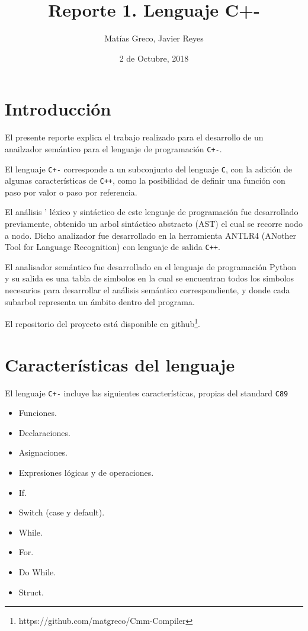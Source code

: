 \documentclass[12pt]{article}
\newcommand{\Cp}{\texttt{C+-}}
\newcommand{\C}{\texttt{C}}
\newcommand{\Cpp}{\texttt{C++}}
\begin{document}

\title{Reporte 1. Lenguaje C+-}
\author{Mat\'ias Greco, Javier Reyes}
\date{2 de Octubre, 2018}
\maketitle

\section*{Introducci\'on}
El presente reporte explica el trabajo realizado para el desarrollo de un anailzador sem\'antico para el lenguaje de programaci\'on \Cp.

El lenguaje \texttt{C+-} corresponde a un subconjunto del lenguaje \C, con la adici\'on de algunas caracter\'isticas de \Cpp, como la posibilidad de definir una funci\'on con paso por valor o paso por referencia.

El an\'alisis  ' l\'exico y sint\'actico de este lenguaje de programación fue desarrollado previamente, obtenido un arbol sintáctico abstracto (AST) el cual se recorre nodo a nodo. Dicho analizador fue desarrollado en la herramienta ANTLR4 (ANother Tool for Language Recognition) con lenguaje de salida \Cpp. 

El analisador sem\'antico fue desarrollado en el lenguaje de programación Python y su salida es una tabla de simbolos en la cual se encuentran todos los simbolos necesarios para desarrollar el an\'alisis sem\'antico correspondiente, y donde cada subarbol representa un \'ambito dentro del programa.

El repositorio del proyecto está disponible en github\footnote{https://github.com/matgreco/Cmm-Compiler}.


\section*{Caracter\'isticas del lenguaje}

El lenguaje \texttt{C+-} incluye las siguientes caracter\'isticas, propias del standard \texttt{C89}
\begin{itemize}
    \item Funciones.
    \item Declaraciones.
    \item Asignaciones.
    \item Expresiones l\'ogicas y de operaciones.
    \item If.
    \item Switch (case y default).
    \item While.
    \item For.
    \item Do While.
    \item Struct.
\end{itemize}
\end{document}
